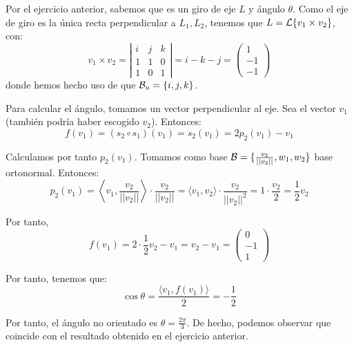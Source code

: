 \begin{ejercicio}
\begin{figure}[H]
    \end{figure}



    Por el ejercicio anterior, sabemos que es un giro de eje $L$ y ángulo $\theta$. Como el eje de giro es la única recta perpendicular a $L_1, L_2$, tenemos que $L=\mathcal{L}\{v_1\times v_2\}$, con:
    \begin{equation*}
        v_1\times v_2 = \left|\begin{array}{ccc}
            i & j & k \\
            1 & 1 & 0 \\
            1 & 0 & 1
        \end{array}\right| =  i-k-j = \left(\begin{array}{c}
            1 \\ -1 \\ -1
        \end{array}\right)
    \end{equation*}
    donde hemos hecho uso de que $\mathcal{B}_u = \{i,j,k\}$.

    Para calcular el ángulo, tomamos un vector perpendicular al eje. Sea el vector $v_1$ (también podría haber escogido $v_2$). Entonces:
    \begin{equation*}
        f(v_1)=(s_2\circ s_1)(v_1) = s_2(v_1) = 2p_2(v_1) - v_1
    \end{equation*}

    Calculamos por tanto $p_2(v_1)$. Tomamos como base $\mathcal{B}=\{\frac{v_2}{||v_2||}, w_1, w_2\}$ base ortonormal. Entonces:
    \begin{equation*}
        p_2(v_1)=\left\langle v_1,\frac{v_2}{||v_2||}\right\rangle  \cdot \frac{v_2}{||v_2||} = \langle v_1,v_2\rangle  \cdot \frac{v_2}{||v_2||^2} = 1\cdot \frac{v_2}{2} = \frac{1}{2}v_2
    \end{equation*}

    Por tanto,
    \begin{equation*}
        f(v_1)=2\cdot \frac{1}{2}v_2 - v_1 = v_2-v_1 = \left(\begin{array}{c}
            0 \\ -1 \\ 1
        \end{array}\right)
    \end{equation*}

    Por tanto, tenemos que:
    \begin{equation*}
        \cos \theta = \frac{\langle v_1, f(v_1)\rangle}{2} = -\frac{1}{2}
    \end{equation*}

    Por tanto, el ángulo no orientado es $\theta = \frac{2\pi}{3}$. De hecho, podemos observar que coincide con el resultado obtenido en el ejercicio anterior.
\end{ejercicio}


